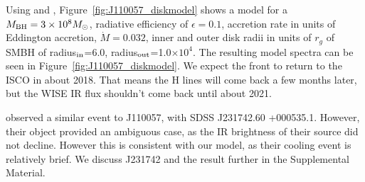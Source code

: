 \documentclass{nature}
\begin{document}
Using \citet{Ford2018} and \citet{Sirko_Goodman2003},
Figure~\ref{fig:J110057_diskmodel} shows a model for a $M_{\rm
BH}=3\times 10^{8} M_{\odot}$, radiative efficiency of $\epsilon=0.1$,
accretion rate in units of Eddington accretion, $\dot{M}=0.032$, inner
and outer disk radii in units of $r_g$ of SMBH of radius$_{\rm
in}$=6.0, radius$_{\rm out}$=1.0$\times 10^{4}$. The resulting model
spectra can be seen in Figure~\ref{fig:J110057_diskmodel}.  We expect
the front to return to the ISCO in about 2018. That means the H lines
will come back a few months later, but the WISE IR flux shouldn't come
back until about 2021.

\cite{Guo2016} observed a similar event to J110057, with SDSS J231742.60
+000535.1. However, their object provided an ambiguous case, as the IR
brightness of their source did not decline. However this is consistent
with our model, as their cooling event is relatively brief. We discuss 
 J231742 and the \citet{Guo2016} result further in the Supplemental Material. 




%

%
\end{document}
